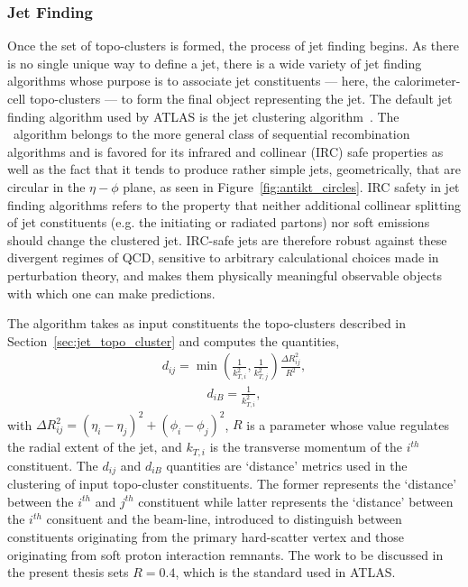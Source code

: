\subsubsection{Jet Finding}
\label{sec:jet_finding}

Once the set of topo-clusters is formed, the process of jet finding begins.
As there is no single unique way to define a jet, there is a wide variety of jet finding algorithms whose
purpose is to associate jet constituents --- here, the calorimeter-cell topo-clusters --- to form
the final object representing the jet.
The default jet finding algorithm used by ATLAS is the
\textit{\antikt} jet clustering algorithm~\cite{Cacciari:2008gp}.
The \antikt~algorithm belongs to the more general class of sequential recombination algorithms
and is favored for its infrared and collinear (IRC) safe properties as well as the fact
that it tends to produce rather simple jets, geometrically, that are circular in the $\eta-\phi$ plane,
as seen in Figure~\ref{fig:antikt_circles}.
IRC safety in jet finding algorithms refers to the property that neither additional collinear splitting of jet constituents (e.g. the initiating or radiated partons)
nor soft emissions should change the clustered jet.
IRC-safe jets are therefore robust against these divergent regimes of QCD, sensitive to arbitrary
calculational choices made in perturbation theory, and makes them physically  meaningful observable objects
with which one can make predictions.

The \antikt algorithm takes as input constituents the topo-clusters described in Section~\ref{sec:jet_topo_cluster}
and computes the quantities,
\begin{align}
        d_{ij} = \min \left( \frac{1}{k^2_{T,i}} , \frac{1}{k^2_{T,j}} \right) \frac{ \Delta R_{ij}^2}{R^2},
        \label{eq:antikt_0}
\end{align}
\begin{align}
        d_{iB} = \frac{1}{k_{T,i}^2},
        \label{eq:antikt_1}
\end{align}
with $\Delta R_{ij}^2 = (\eta_i - \eta_j)^2 + (\phi_i - \phi_j)^2$, {\color{red}{its rapidity, right?}} $R$ is a parameter whose value regulates the radial extent of
the jet, and $k_{T,i}$ is the transverse momentum of the $i^{th}$ constituent.
The $d_{ij}$ and $d_{iB}$ quantities are `distance' metrics used in the clustering of input topo-cluster constituents.
The former represents the `distance' between the $i^{th}$ and $j^{th}$ constituent while latter represents the
`distance' between the $i^{th}$ consituent and the beam-line, introduced to distinguish between constituents
originating from the primary hard-scatter vertex and those originating from soft proton interaction remnants.
The work to be discussed in the present thesis sets $R=0.4$, which is the standard used in ATLAS.

